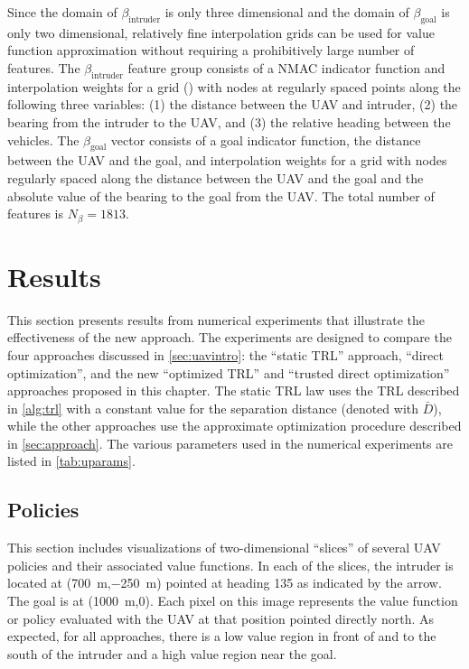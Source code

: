Since the domain of $\beta_\text{intruder}$ is only three dimensional and the domain of $\beta_\text{goal}$ is only two dimensional, relatively fine interpolation grids can be used for value function approximation without requiring a prohibitively large number of features. The $\beta_\text{intruder}$ feature group consists of a NMAC indicator function and interpolation weights for a grid () with nodes at regularly spaced points along the following three variables: (1) the distance between the UAV and intruder, (2) the bearing from the intruder to the UAV, and (3) the relative heading between the vehicles. The $\beta_\text{goal}$ vector consists of a goal indicator function, the distance between the UAV and the goal, and interpolation weights for a grid
with nodes regularly spaced along the distance between the UAV and the goal and the absolute value of the bearing to the goal from the UAV. The total number of features is $N_\beta = 1813$.


\section{Results} \label{sec:results}

This section presents results from numerical experiments that illustrate the effectiveness of the new approach. The experiments are designed to compare the four approaches discussed in \cref{sec:uavintro}: the ``static TRL'' approach, ``direct optimization'', and the new ``optimized TRL'' and ``trusted direct optimization'' approaches proposed in this chapter. The static TRL law uses the TRL described in \cref{alg:trl} with a constant value for the separation distance (denoted with $\bar{D}$), while the other approaches use the approximate optimization procedure described in \cref{sec:approach}. The various parameters used in the numerical experiments are listed in \cref{tab:uparams}.

\subsection{Policies}

This section includes visualizations of two-dimensional ``slices'' of several UAV policies and their associated value functions. In each of the slices, the intruder is located at (\SI{700}{m},\SI{-250}{m}) pointed at heading 135 as indicated by the arrow. The goal is at (\SI{1000}{m},\num{0}). Each pixel on this image represents the value function or policy evaluated with the UAV at that position pointed directly north. As expected, for all approaches, there is a low value region in front of and to the south of the intruder and a high value region near the goal.

